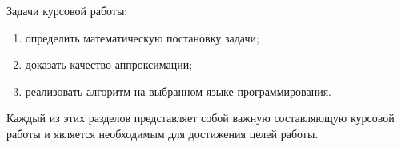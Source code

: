 Задачи курсовой работы:

\begin{enumerate}
	\item определить математическую постановку задачи;
	\item доказать качество аппроксимации;
	\item реализовать алгоритм на выбранном языке программирования.
\end{enumerate}

Каждый из этих разделов представляет собой важную составляющую курсовой работы и является необходимым для достижения целей работы.

